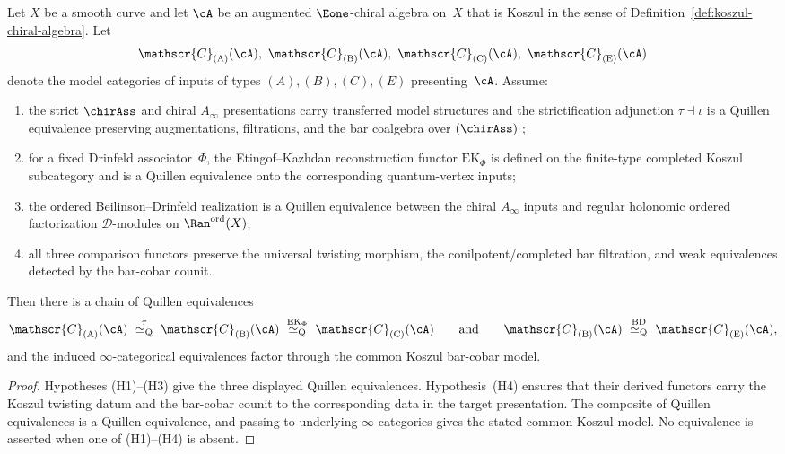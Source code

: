 \begin{theorem}
\label{thm:e1-chiral-notions-collapse}
Let $X$ be a smooth curve and let $\cA$ be an augmented
$\Eone$-chiral algebra on~$X$ that is Koszul in the sense of
Definition~\ref{def:koszul-chiral-algebra}. Let
\[
 \mathscr{C}_{(\mathrm{A})}(\cA),\
 \mathscr{C}_{(\mathrm{B})}(\cA),\
 \mathscr{C}_{(\mathrm{C})}(\cA),\
 \mathscr{C}_{(\mathrm{E})}(\cA)
\]
denote the model categories of inputs of types $(A), (B), (C),
(E)$ presenting~$\cA$. Assume:
\begin{enumerate}[label=\textup{(H\arabic*)}]
\item the strict $\chirAss$ and chiral $A_\infty$ presentations
 carry transferred model structures and the strictification
 adjunction
 $\tau\dashv\iota$ is a Quillen equivalence preserving
 augmentations, filtrations, and the bar coalgebra over
 $(\chirAss)^{\text{\textexclamdown}}$;
\item for a fixed Drinfeld associator~$\Phi$, the
 Etingof--Kazhdan reconstruction functor
 $\mathrm{EK}_\Phi$ is defined on the finite-type completed
 Koszul subcategory and is a Quillen equivalence onto the
 corresponding quantum-vertex inputs;
\item the ordered Beilinson--Drinfeld realization is a Quillen
 equivalence between the chiral $A_\infty$ inputs and regular
 holonomic ordered factorization $\mathcal D$-modules on
 $\Ran^{\mathrm{ord}}(X)$;
\item all three comparison functors preserve the universal
 twisting morphism, the conilpotent/completed bar filtration,
 and weak equivalences detected by the bar-cobar counit.
\end{enumerate}
Then there is a chain of Quillen equivalences
\[
 \mathscr{C}_{(\mathrm{A})}(\cA)
 \ \overset{\tau}{\simeq_{\mathrm{Q}}}\
 \mathscr{C}_{(\mathrm{B})}(\cA)
 \ \overset{\mathrm{EK}_{\Phi}}{\simeq_{\mathrm{Q}}}\
 \mathscr{C}_{(\mathrm{C})}(\cA)
 \qquad\text{and}\qquad
 \mathscr{C}_{(\mathrm{B})}(\cA)
 \ \overset{\mathrm{BD}}{\simeq_{\mathrm{Q}}}\
 \mathscr{C}_{(\mathrm{E})}(\cA),
\]
and the induced $\infty$-categorical equivalences factor
through the common Koszul bar-cobar model.
\end{theorem}

\begin{proof}
Hypotheses \textup{(H1)--(H3)} give the three displayed
Quillen equivalences. Hypothesis~\textup{(H4)} ensures that
their derived functors carry the Koszul twisting datum and the
bar-cobar counit to the corresponding data in the target
presentation. The composite of Quillen equivalences is a Quillen
equivalence, and passing to underlying $\infty$-categories gives
the stated common Koszul model. No equivalence is asserted when
one of \textup{(H1)--(H4)} is absent.
\end{proof}

